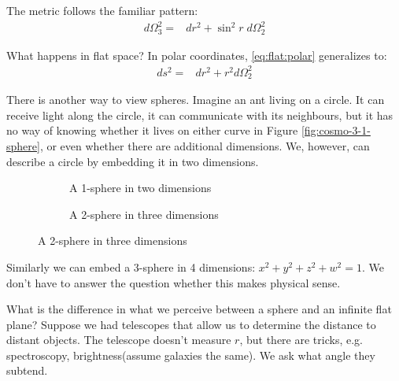 \documentclass[]{article}
\begin{document}
The metric follows the familiar pattern:
\begin{align*}
	d\Omega_3^2 =& dr^2 + \sin^2 r\; d\Omega_2^2
\end{align*}

What happens in flat space? In polar coordinates, \eqref{eq:flat:polar} generalizes to:
\begin{align*}
	ds^2 =& dr^2 + r^2 d\Omega_2^2
\end{align*}

There is another way to view spheres. Imagine an ant living on a circle. It can receive light along the circle, it can communicate with its neighbours, but it has no way of knowing whether it lives on either curve in Figure \ref{fig:cosmo-3-1-sphere}, or even whether there are additional dimensions. We, however, can describe a circle by embedding it in two dimensions.
\begin{figure}[H]
	\caption{Embedding an $n$-sphere in $n+1$ dimensions}
	\begin{subfigure}[t]{0.5\textwidth}
		\caption{A 1-sphere in two dimensions}
	\end{subfigure}
	\begin{subfigure}[t]{0.5\textwidth}
		\caption{A 2-sphere in three dimensions}
	\end{subfigure}
\end{figure}
Similarly we can embed a 3-sphere in 4 dimensions: $x^2 + y^2 + z^2+w^2= 1$. We don't have to answer the question whether this makes physical sense.


What is the difference in what we perceive between a sphere and an infinite flat plane? Suppose we had telescopes that allow us to determine the distance to distant objects. The telescope doesn't measure $r$, but there are tricks, e.g. spectroscopy, brightness(assume galaxies the same). We ask what angle they subtend. 
\end{document}
